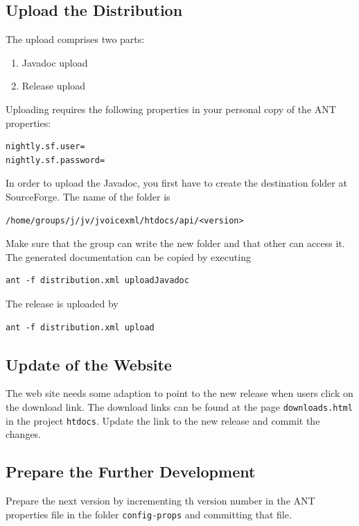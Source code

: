 \documentclass[11pt,a4paper]{article}
\begin{document}
\subsection{Upload the Distribution}

The upload comprises two parts:
\begin{enumerate}
  \item Javadoc upload
  \item Release upload
\end{enumerate}

Uploading requires the following properties in your personal copy of the ANT
properties:
\begin{lstlisting}
nightly.sf.user=
nightly.sf.password=
\end{lstlisting}

In order to upload the Javadoc, you first have to create the
destination folder at SourceForge. The name of the folder is
\begin{lstlisting}
/home/groups/j/jv/jvoicexml/htdocs/api/<version>
\end{lstlisting}
Make sure that the group can write the new folder and that other can access it.
The generated documentation can be copied by executing
\begin{lstlisting}
ant -f distribution.xml uploadJavadoc
\end{lstlisting}

The release is uploaded by 
\begin{lstlisting}
ant -f distribution.xml upload
\end{lstlisting}

\subsection{Update of the Website}

The web site needs some adaption to point to the new release when users click
on the download link. The download links can be found at the page
\texttt{downloads.html} in the project \texttt{htdocs}. Update the link
to the new release and commit the changes.

\subsection{Prepare the Further Development}

Prepare the next version by incrementing th version number in the ANT
properties file in the folder \texttt{config-props} and committing that file.




\end{document}
